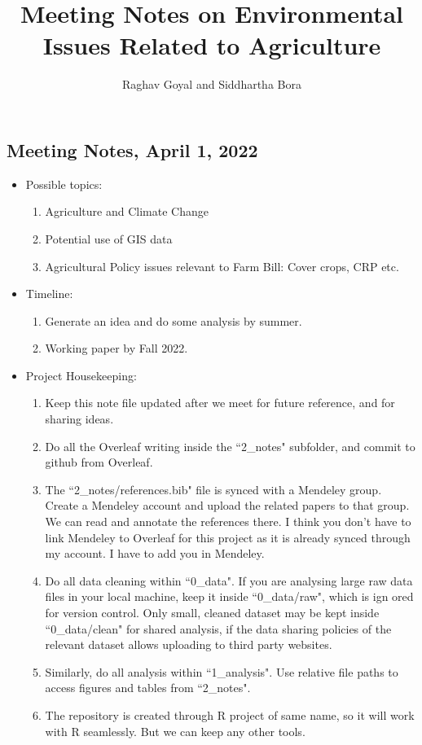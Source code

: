 \documentclass[hidelinks,12pt]{article}
\begin{document}
\title{Meeting Notes on Environmental Issues Related to Agriculture }

\author{Raghav Goyal and Siddhartha Bora}


\date{}
\maketitle
\doublespacing

\subsection*{Meeting Notes, April 1, 2022}
\begin{itemize}
    \item Possible topics:
    \begin{enumerate}
        \item Agriculture and Climate Change
        \item Potential use of GIS data
        \item Agricultural Policy issues relevant to Farm Bill: Cover crops, CRP etc. 
    \end{enumerate}
    \item Timeline:
    \begin{enumerate}
        \item Generate an idea and do some analysis by summer.
        \item Working paper by Fall 2022. 
    \end{enumerate}
    \item Project Housekeeping: 
    \begin{enumerate}
        \item Keep this note file updated after we meet for future reference, and for sharing ideas.
        \item Do all the Overleaf writing inside the ``2\_notes" subfolder, and commit to github from Overleaf.
        \item The ``2\_notes/references.bib" file is synced with a Mendeley group. Create a Mendeley account and upload the related papers to that group. We can read and annotate the references there. I think you don't have to link Mendeley to Overleaf for this project as it is already synced through my account. I have to add you in Mendeley.  
        \item Do all data cleaning within ``0\_data". If you are analysing large raw data files in your local machine, keep it inside ``0\_data/raw", which is ign ored for version control. Only small, cleaned dataset may be kept inside ``0\_data/clean" for shared analysis, if the data sharing policies of the relevant dataset allows uploading to third party websites.
        \item Similarly, do all analysis within ``1\_analysis". Use relative file paths to access figures and tables from ``2\_notes".
        \item The repository is created through R project of same name, so it will work with R seamlessly. But we can keep any other tools.
    \end{enumerate}
\end{itemize}



\pagebreak
\begin{singlespace}
\setlength\bibsep{0pt}


\end{singlespace}
\end{document}
